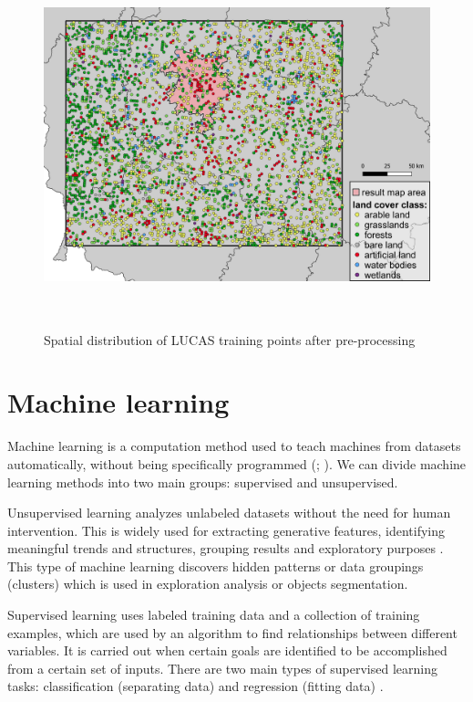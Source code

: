 \documentclass{amuthesis}
\begin{document}
\begin{figure}[t]

{\centering \includegraphics[width=5.875in,height=4.16667in]{./figures/lucas_distribution.png}

}

\caption{\label{fig-rycina4}Spatial distribution of LUCAS training
points after pre-processing}

\end{figure}

\hypertarget{sec-ml}{%
\section{Machine learning}\label{sec-ml}}

Machine learning is a computation method used to teach machines from
datasets automatically, without being specifically programmed
(\textcite{mahesh_machine_2018}; \textcite{sarker_machine_2021}). We can
divide machine learning methods into two main groups: supervised and
unsupervised.

Unsupervised learning analyzes unlabeled datasets without the need for
human intervention. This is widely used for extracting generative
features, identifying meaningful trends and structures, grouping results
and exploratory purposes \autocite{sarker_machine_2021}. This type of
machine learning discovers hidden patterns or data groupings (clusters)
which is used in exploration analysis or objects segmentation.

Supervised learning uses labeled training data and a collection of
training examples, which are used by an algorithm to find relationships
between different variables. It is carried out when certain goals are
identified to be accomplished from a certain set of inputs. There are
two main types of supervised learning tasks: classification (separating
data) and regression (fitting data) \autocite{sarker_machine_2021}.
\end{document}
